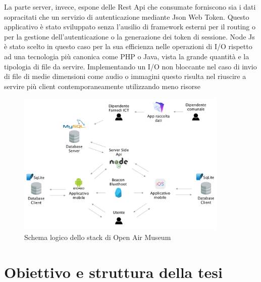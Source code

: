 La parte server, invece, espone delle Rest Api che consumate forniscono sia i dati sopracitati che un servizio di autenticazione mediante Json Web Token. Questo applicativo è stato sviluppato senza l’ausilio di framework esterni per il routing o per la gestione dell’autenticazione o la generazione dei token di sessione. Node Js è stato scelto in questo caso per la sua efficienza nelle operazioni di I/O rispetto ad una tecnologia più canonica come PHP o Java, vista la grande quantità e la tipologia di file da servire. Implementando un I/O non bloccante nel caso di invio di file di medie dimensioni come audio o immagini questo risulta nel riuscire a servire più client contemporaneamente utilizzando meno risorse \cite{BlockingVsNonBlocking} \vspace{5mm}

\begin{figure}[h]
\centering
\includegraphics[width=0.9\textwidth]{images/SchemaOpenAirMuseum.png}
\caption{Schema logico dello stack di Open Air Museum}
\end{figure}

\section{Obiettivo e struttura della tesi}\vspace{5mm}

